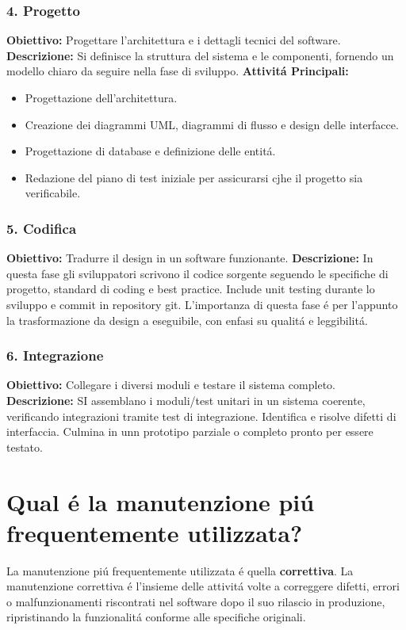 \documentclass[11pt]{article}
\begin{document}
\subsubsection{4. Progetto}
\label{sec:org1a74040}
\textbf{\textbf{Obiettivo:}} Progettare l'architettura e i dettagli tecnici del software.
\textbf{\textbf{Descrizione:}} Si definisce la struttura del sistema e le componenti, fornendo un modello chiaro da seguire nella fase di sviluppo.
\textbf{\textbf{Attivitá Principali:}}
\begin{itemize}
\item Progettazione dell'architettura.
\item Creazione dei diagrammi UML, diagrammi di flusso e design delle interfacce.
\item Progettazione di database e definizione delle entitá.
\item Redazione del piano di test iniziale per assicurarsi cjhe il progetto sia verificabile.
\end{itemize}
\subsubsection{5. Codifica}
\label{sec:orgd76ec5a}
\textbf{\textbf{Obiettivo:}} Tradurre il design in un software funzionante.
\textbf{\textbf{Descrizione:}} In questa fase gli sviluppatori scrivono il codice sorgente seguendo le specifiche di progetto, standard di coding e best practice. Include unit testing durante lo sviluppo e commit in repository git. L'importanza di questa fase é per l'appunto la trasformazione da design a eseguibile, con enfasi su qualitá e leggibilitá.
\subsubsection{6. Integrazione}
\label{sec:org8504924}
\textbf{\textbf{Obiettivo:}} Collegare i diversi moduli e testare il sistema completo.
\textbf{\textbf{Descrizione:}} SI assemblano i moduli/test unitari in un sistema coerente, verificando integrazioni tramite test di integrazione. Identifica e risolve difetti di interfaccia. Culmina in unn  prototipo parziale o completo pronto per essere testato.
\section{Qual é la manutenzione piú frequentemente utilizzata?}
\label{sec:org2f9938d}
La manutenzione piú frequentemente utilizzata é quella \textbf{\textbf{correttiva}}.
La manutenzione correttiva é l'insieme delle attivitá volte a correggere difetti, errori o malfunzionamenti riscontrati nel software dopo il suo rilascio in produzione, ripristinando la funzionalitá conforme alle specifiche originali.
\end{document}
